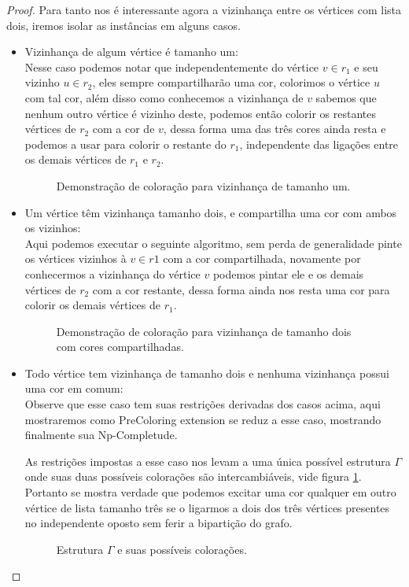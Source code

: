 \begin{proof}
 Para tanto nos é interessante agora a vizinhança entre os vértices com lista dois, iremos isolar as instâncias em alguns casos.
 \begin{itemize}
   \item Vizinhança de algum vértice é tamanho um:\\
   Nesse caso podemos notar que independentemente do vértice $v \in r_1$ e seu vizinho $u \in r_2$, eles sempre compartilharão uma cor, colorimos o vértice $u$ com tal cor, além disso como conhecemos a vizinhança de $v$ sabemos que nenhum outro vértice é vizinho deste, podemos então colorir os restantes vértices de $r_2$ com a cor de $v$, dessa forma uma das três cores ainda resta e podemos a usar para colorir o restante do $r_1$, independente das ligações entre os demais vértices de $r_1$ e $r_2$.
   \begin{figure}[H]
     \centering
     \fontsize{6}{10}
     
     \caption{Demonstração de coloração para vizinhança de tamanho um.}
   \end{figure}
   \item Um vértice têm vizinhança tamanho dois, e compartilha uma cor com ambos os vizinhos:\\
    Aqui podemos executar o seguinte algoritmo, sem perda de generalidade pinte os vértices vizinhos à $v \in r1$ com a cor compartilhada, novamente por conhecermos a vizinhança do vértice $v$ podemos pintar ele e os demais vértices de $r_2$ com a cor restante, dessa forma ainda nos resta uma cor para colorir os demais vértices de $r_1$.
    \begin{figure}[H]
     \centering
     \fontsize{6}{10}
     
     \caption{Demonstração de coloração para vizinhança de tamanho dois com cores compartilhadas.}
   \end{figure}
   \item Todo vértice tem vizinhança de tamanho dois e nenhuma vizinhança possui uma cor em comum:\\
   Observe que esse caso tem suas restrições derivadas dos casos acima, aqui mostraremos como PreColoring extension se reduz a esse caso, mostrando finalmente sua Np-Completude.
   
   As restrições impostas a esse caso nos levam a uma única possível estrutura $\Gamma$ onde suas duas possíveis colorações são intercambiáveis, vide figura \ref{fig:2-edge-b}. Portanto se mostra verdade que podemos excitar uma cor qualquer em outro vértice de lista tamanho três se o ligarmos a dois dos três vértices presentes no independente oposto sem ferir a bipartição do grafo.
   \begin{figure}[H]
     \centering
     \fontsize{6}{10}
     
     \caption{Estrutura $\Gamma$ e suas possíveis colorações.}
     \label{fig:2-edge-b}
   \end{figure}
   

\end{itemize}
\end{proof}
